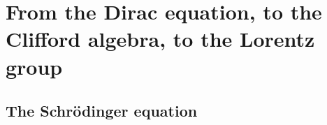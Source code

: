

\chapter{From the Dirac equation, to the Clifford algebra, to the Lorentz group}
\setcounter{theorem}{0}
\setcounter{equation}{0}


\renewcommand{\theenumi}{\roman{enumi}}
\renewcommand{\labelenumi}{\textnormal{(\theenumi)}$\;\;$}


\section{The Schr\"odinger equation}

